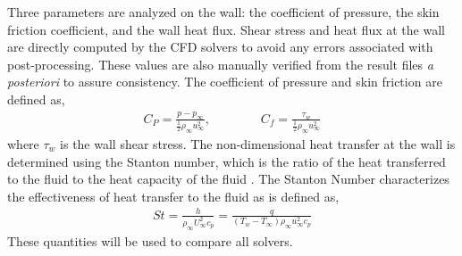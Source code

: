 \documentclass[journal ]{new-aiaa}
\begin{document}
Three parameters are analyzed on the wall: the coefficient of pressure, the skin friction coefficient, and the wall heat flux. Shear stress and heat flux at the wall are directly computed  by the CFD solvers to avoid any errors associated with post-processing. These values are also manually verified from the result files \emph{a posteriori} to assure consistency. The coefficient of pressure and skin friction are defined as, 
\begin{align}
    C_P = \frac{p - p_{\infty}}{\frac{1}{2} \rho_{\infty} u_{\infty}^2}, \qquad \qquad
    C_f = \frac{\tau_w}{\frac{1}{2} \rho_{\infty} u_{\infty}^2}
\end{align}
where $\tau_w$ is the wall shear stress. %
The non-dimensional heat transfer at the wall is determined using the Stanton number, which is the ratio of the heat transferred to the fluid to the heat capacity of the fluid \cite{Hall2018}. The Stanton Number characterizes the effectiveness of heat transfer to the fluid as is defined as,
\begin{align}
    St = \frac{h}{\rho_{\infty} U_{\infty}^2 c_p} = \frac{q}{ \left(T_w - T_{\infty} \right)\rho_{\infty} u_{\infty}^2 c_p}
\end{align}
These quantities will be used to compare all solvers.

\end{document}
